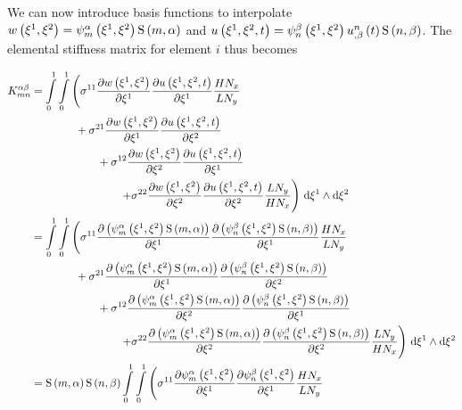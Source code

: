 We can now introduce basis functions to interpolate \ie
$ w\left( \xi^{1},\xi^{2} \right) =   \psi_{m}^{\alpha} \left( \xi^{1},\xi^{2} \right)     \mathrm{S} \left( m,\alpha \right)  $
and
$ u\left( \xi^{1},\xi^{2},t \right) =   \psi_{n}^{\beta} \left( \xi^{1},\xi^{2} \right)     {u}^{n} _{,\beta} \left( t \right)    \mathrm{S} \left( n,\beta \right)  $. The
elemental stiffness matrix for element $i$ thus becomes

\begin{equation}
  \begin{aligned}
    K^{\alpha\beta}_{mn}&=\dintl{0}{1}\dintl{0}{1}\left(
    \conductivitytensorsymbol^{11}\delby{\fnof{w}{\xione,\xitwo}}{\xione}
    \delby{\fnof{u}{\xione,\xitwo,t}}{\xione}\dfrac{H N_{x}}{L N_{y}}\right.\\
    &\qquad\qquad+\conductivitytensorsymbol^{21}\delby{\fnof{w}{\xione,\xitwo}}{\xione}
    \delby{\fnof{u}{\xione,\xitwo,t}}{\xitwo}\\
    &\qquad\qquad\qquad+\conductivitytensorsymbol^{12}\delby{\fnof{w}{\xione,\xitwo}}{\xitwo}
    \delby{\fnof{u}{\xione,\xitwo,t}}{\xione} \\
    &\qquad\qquad\qquad\qquad\left.+\conductivitytensorsymbol^{22}\delby{\fnof{w}{\xione,\xitwo}}{\xitwo}
    \delby{\fnof{u}{\xione,\xitwo,t}}{\xitwo}\dfrac{L N_{y}}{H N_{x}}\right)\infinitesimaltwo{\xione}{\xitwo} \\
    &=\dintl{0}{1}\dintl{0}{1}\left(\conductivitytensorsymbol^{11}
    \delby{\pbrac{\gbfn{m}{\alpha}{\xione,\xitwo}\gsf{m}{\alpha}}}{\xione}
    \delby{\pbrac{\gbfn{n}{\beta}{\xione,\xitwo}\gsf{n}{\beta}}}{\xione}\dfrac{H N_{x}}{L N_{y}}\right.\\
    &\qquad\qquad+\conductivitytensorsymbol^{21}\delby{\pbrac{\gbfn{m}{\alpha}{\xione,\xitwo}\gsf{m}{\alpha}}}{\xione}
    \delby{\pbrac{\gbfn{n}{\beta}{\xione,\xitwo}\gsf{n}{\beta}}}{\xitwo}\\
    &\qquad\qquad\qquad+\conductivitytensorsymbol^{12}
    \delby{\pbrac{\gbfn{m}{\alpha}{\xione,\xitwo}\gsf{m}{\alpha}}}{\xitwo}
    \delby{\pbrac{\gbfn{n}{\beta}{\xione,\xitwo}\gsf{n}{\beta}}}{\xione}\\
    &\qquad\qquad\qquad\qquad\left.+\conductivitytensorsymbol^{22}
    \delby{\pbrac{\gbfn{m}{\alpha}{\xione,\xitwo}\gsf{m}{\alpha}}}{\xitwo}
    \delby{\pbrac{\gbfn{n}{\beta}{\xione,\xitwo}\gsf{n}{\beta}}}{\xitwo}\dfrac{L N_{y}}{H N_{x}}\right)
    \infinitesimaltwo{\xione}{\xitwo}\\
    &=\gsf{m}{\alpha}\gsf{n}{\beta}\dintl{0}{1}\dintl{0}{1}\left(
    \conductivitytensorsymbol^{11}\delby{\gbfn{m}{\alpha}{\xione,\xitwo}}{\xione}
    \delby{\gbfn{n}{\beta}{\xione,\xitwo}}{\xione}\dfrac{H N_{x}}{L N_{y}}\right.\\

\end{aligned}
\end{equation}
